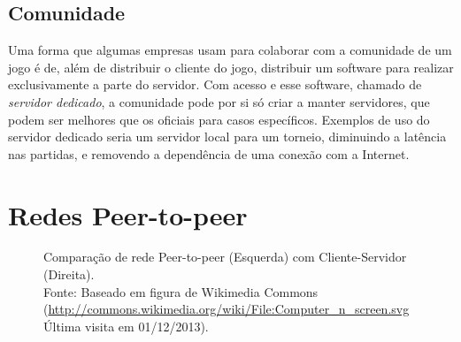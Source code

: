   \subsection{Comunidade}
    Uma forma que algumas empresas usam para colaborar com a comunidade de um jogo é de, além de
    distribuir o cliente do jogo, distribuir um software para realizar exclusivamente a parte
    do servidor. Com acesso e esse software, chamado de \textit{servidor dedicado}, a comunidade
    pode por si só criar a manter servidores, que podem ser melhores que os oficiais para casos
    específicos. Exemplos de uso do servidor dedicado seria um servidor local para um torneio, 
    diminuindo a latência nas partidas, e removendo a dependência de uma conexão com a Internet.

\section{Redes Peer-to-peer}
\label{sec:conceitos:redes}

  \begin{figure}[h]
    \begin{centering}
    \caption{Comparação de rede Peer-to-peer (Esquerda) com Cliente-Servidor (Direita). \\
      Fonte: Baseado em figura de Wikimedia Commons (\url{http://commons.wikimedia.org/wiki/File:Computer_n_screen.svg}
      Última visita em 01/12/2013).
    }
    \end{centering}
  \end{figure}

